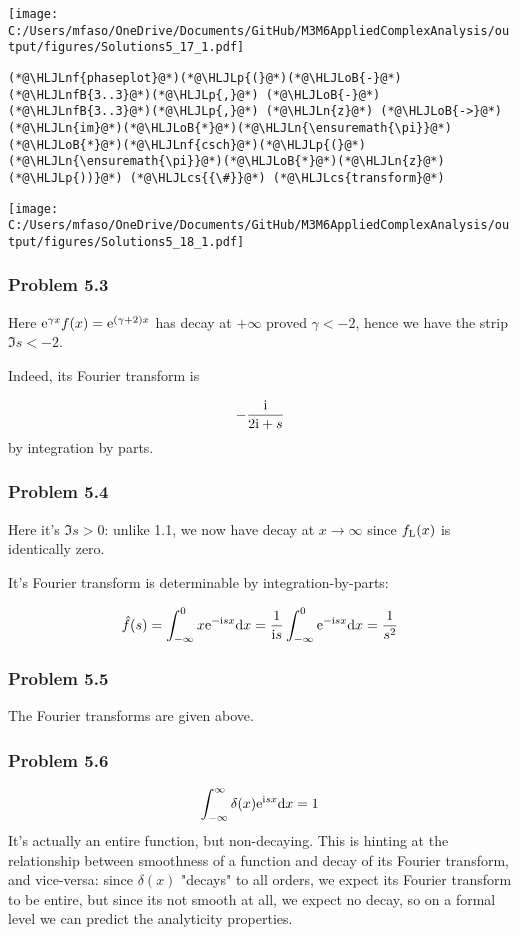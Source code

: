 \documentclass[12pt,a4paper]{article}
\newcommand{\HLJLn}[1]{#1}
\newcommand{\HLJLnf}[1]{\textcolor[RGB]{66,102,213}{#1}}
\newcommand{\HLJLnfB}[1]{\textcolor[RGB]{59,151,46}{#1}}
\newcommand{\HLJLoB}[1]{\textcolor[RGB]{102,102,102}{\textbf{#1}}}
\newcommand{\HLJLp}[1]{#1}
\newcommand{\HLJLcs}[1]{\textcolor[RGB]{153,153,119}{\textit{#1}}}
\def\D{ {\rm d} }
\def\I{ {\rm i} }
\def\E{ {\rm e} }
\def\dx{\D x}
\begin{document}
\texttt{[image: C:/Users/mfaso/OneDrive/Documents/GitHub/M3M6AppliedComplexAnalysis/output/figures/Solutions5\_17\_1.pdf]}

\begin{lstlisting}
(*@\HLJLnf{phaseplot}@*)(*@\HLJLp{(}@*)(*@\HLJLoB{-}@*)(*@\HLJLnfB{3..3}@*)(*@\HLJLp{,}@*) (*@\HLJLoB{-}@*)(*@\HLJLnfB{3..3}@*)(*@\HLJLp{,}@*) (*@\HLJLn{z}@*) (*@\HLJLoB{->}@*) (*@\HLJLn{im}@*)(*@\HLJLoB{*}@*)(*@\HLJLn{\ensuremath{\pi}}@*)(*@\HLJLoB{*}@*)(*@\HLJLnf{csch}@*)(*@\HLJLp{(}@*)(*@\HLJLn{\ensuremath{\pi}}@*)(*@\HLJLoB{*}@*)(*@\HLJLn{z}@*)(*@\HLJLp{))}@*) (*@\HLJLcs{{\#}}@*) (*@\HLJLcs{transform}@*)
\end{lstlisting}

\texttt{[image: C:/Users/mfaso/OneDrive/Documents/GitHub/M3M6AppliedComplexAnalysis/output/figures/Solutions5\_18\_1.pdf]}

\subsubsection{Problem 5.3}
Here $\E^{\gamma x } f(x) = \E^{(\gamma+2) x}$ has decay at $+\infty$ proved $\gamma < -2$, hence we have the strip $\Im s < -2$.

Indeed, its Fourier transform is

\[
-{\I \over 2 \I +s}
\]
by integration by parts.

\subsubsection{Problem 5.4}
Here it's $\Im s > 0$: unlike 1.1, we now have decay at $x \rightarrow \infty$ since $f_{\rm L}(x)$ is identically zero.

It's Fourier transform is determinable by integration-by-parts:

\[
\hat f(s) = \int_{-\infty}^0 x \E^{-\I s x} \dx = {1 \over \I s} \int_{-\infty}^0\E^{-\I s x} \dx = {1 \over s^2}
\]
\subsubsection{Problem 5.5}
The Fourier transforms are given above.

\subsubsection{Problem 5.6}
\[
\int_{-\infty}^\infty \delta(x) \E^{\I s x} \dx = 1
\]
It's actually an entire function, but non-decaying. This is hinting at the relationship between smoothness of a function and decay of its Fourier transform, and vice-versa: since $\delta(x)$ "decays" to all orders, we expect its Fourier transform to be entire, but since its not smooth at all, we expect no decay, so on a formal level we can predict the analyticity properties.
\end{document}

